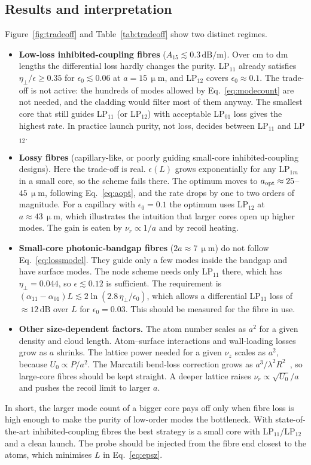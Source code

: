 \documentclass[11pt,a4paper]{article}
\newcommand{\micrometre}{\upmu m}\newcommand{\microkelvin}{\upmu K}
\newcommand{\SI}[2]{\ensuremath{#1\,\mathrm{#2}}}
\newcommand{\etaeff}{\eta_{\perp}}
\begin{document}
\subsection{Results and interpretation}
Figure~\ref{fig:tradeoff} and Table~\ref{tab:tradeoff} show two distinct regimes.
\begin{itemize}
\item \textbf{Low-loss inhibited-coupling fibres} ($A_{15}\lesssim\SI{0.3}{dB/m}$). Over cm to dm lengths the differential loss hardly changes the purity. LP$_{11}$ already satisfies $\etaeff/\epsilon\ge0.35$ for $\epsilon_0\lesssim0.06$ at $a=\SI{15}{\micrometre}$, and LP$_{12}$ covers $\epsilon_0\approx0.1$. The trade-off is not active: the hundreds of modes allowed by Eq.~\eqref{eq:modecount} are not needed, and the cladding would filter most of them anyway. The smallest core that still guides LP$_{11}$ (or LP$_{12}$) with acceptable LP$_{01}$ loss gives the highest rate. In practice launch purity, not loss, decides between LP$_{11}$ and LP$_{12}$.
\item \textbf{Lossy fibres} (capillary-like, or poorly guiding small-core inhibited-coupling designs). Here the trade-off is real. $\epsilon(L)$ grows exponentially for any LP$_{1m}$ in a small core, so the scheme fails there. The optimum moves to $a_{\rm opt}\approx25$--\SI{45}{\micrometre}, following Eq.~\eqref{eq:aopt}, and the rate drops by one to two orders of magnitude. For a capillary with $\epsilon_0=0.1$ the optimum uses LP$_{12}$ at $a\approx\SI{43}{\micrometre}$, which illustrates the intuition that larger cores open up higher modes. The gain is eaten by $\nu_r\propto1/a$ and by recoil heating.
\item \textbf{Small-core photonic-bandgap fibres} ($2a\approx\SI{7}{\micrometre}$) do not follow Eq.~\eqref{eq:lossmodel}. They guide only a few modes inside the bandgap and have surface modes. The node scheme needs only LP$_{11}$ there, which has $\etaeff=0.044$, so $\epsilon\lesssim0.12$ is sufficient. The requirement is $(\alpha_{11}-\alpha_{01})L\lesssim2\ln(2.8\,\etaeff/\epsilon_0)$, which allows a differential LP$_{11}$ loss of $\approx\SI{12}{dB}$ over $L$ for $\epsilon_0=0.03$. This should be measured for the fibre in use.
\item \textbf{Other size-dependent factors.} The atom number scales as $a^2$ for a given density and cloud length. Atom--surface interactions and wall-loading losses grow as $a$ shrinks. The lattice power needed for a given $\nu_z$ scales as $a^2$, because $U_0\propto P/a^2$. The Marcatili bend-loss correction grows as $a^3/\lambda^2R^2$~\cite{marcatili1964}, so large-core fibres should be kept straight. A deeper lattice raises $\nu_r\propto\sqrt{U_0}/a$ and pushes the recoil limit to larger $a$.
\end{itemize}
In short, the larger mode count of a bigger core pays off only when fibre loss is high enough to make the purity of low-order modes the bottleneck. With state-of-the-art inhibited-coupling fibres the best strategy is a small core with LP$_{11}$/LP$_{12}$ and a clean launch. The probe should be injected from the fibre end closest to the atoms, which minimises $L$ in Eq.~\eqref{eq:epsz}.
\end{document}

